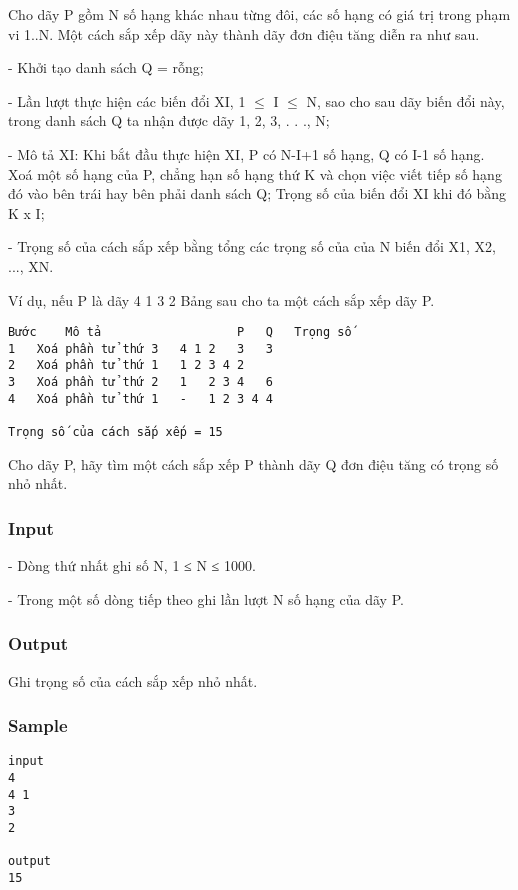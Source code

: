 



   Cho dãy P gồm N số hạng khác nhau từng đôi, các số hạng có giá trị trong phạm vi 1..N. Một cách sắp xếp dãy này thành dãy đơn điệu tăng diễn ra như sau.  

   -         Khởi tạo danh sách Q = rỗng;  

   -         Lần lượt thực hiện các biến đổi XI, 1  $\le$  I  $\le$ N, sao cho sau dãy biến đổi này, trong danh sách Q ta nhận được dãy 1, 2, 3, . . ., N;  

   -         Mô tả XI: Khi bắt đầu thực hiện XI, P có N-I+1 số hạng, Q có I-1 số hạng. Xoá một số hạng của P, chẳng hạn số hạng thứ K và chọn việc viết tiếp số hạng đó vào bên trái hay bên phải danh sách Q; Trọng số của biến đổi XI khi đó bằng K x I;  

   -         Trọng số của cách sắp xếp bằng tổng các trọng số của của N biến đổi X1, X2, ..., XN.  

   Ví dụ, nếu P là dãy 4 1 3 2 Bảng sau cho ta một cách sắp xếp dãy P.  
\begin{verbatim}
Bước	Mô tả	                P	Q	Trọng số
1	Xoá phần tử thứ 3	4 1 2	3	3
2	Xoá phần tử thứ 1	1 2	3 4	2
3	Xoá phần tử thứ 2	1	2 3 4	6
4	Xoá phần tử thứ 1	-	1 2 3 4	4

Trọng số của cách sắp xếp = 15

\end{verbatim}

   Cho dãy P, hãy tìm một cách sắp xếp P thành dãy Q đơn điệu tăng có trọng số nhỏ nhất.  



\subsubsection{   Input  }



   -       Dòng thứ nhất ghi số N, 1 ≤ N ≤ 1000.  

   -       Trong một số dòng tiếp theo ghi lần lượt N số hạng của dãy P.  



\subsubsection{   Output  }



   Ghi trọng số của cách sắp xếp nhỏ nhất.  



\subsubsection{   Sample  }
\begin{verbatim}
input 
4 
4 1 
3 
2

output 
15
\end{verbatim}
